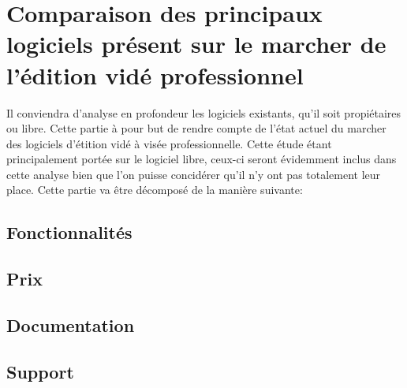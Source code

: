 \newpage
\section{Comparaison des principaux logiciels pr\'{e}sent sur le marcher de
l'\'{e}dition vid\'{e} professionnel}

  Il conviendra d'analyse en profondeur les logiciels existants, qu'il soit
propi\'{e}taires ou libre. Cette partie \`{a} pour but de rendre compte de
l'\'{e}tat actuel du marcher des logiciels d'\'{e}tition vid\'{e} \`{a}
vis\'{e}e professionnelle. Cette \'{e}tude \'{e}tant principalement port\'{e}e
sur le logiciel libre, ceux-ci seront \'{e}videmment inclus dans cette analyse
bien que l'on puisse concid\'{e}rer qu'il n'y ont pas totalement leur place. Cette
partie va être d\'{e}compos\'{e} de la mani\`{e}re suivante:

  \subsection{Fonctionnalit\'{e}s}
  \subsection{Prix}
  \subsection{Documentation}
  \subsection{Support}

